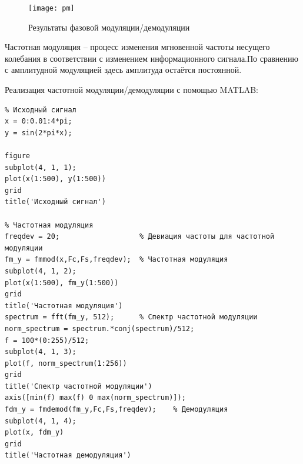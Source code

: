 \documentclass[10pt,a4paper]{article}
\begin{document}
\begin{figure}[h]\centering
	\texttt{[image: pm]}
	\caption{Результаты фазовой модуляции/демодуляции}\label{fig.pm}
\end{figure}                                                                                                                                                                                                                                                                                                                                                                                                                                                                                                                                                                                                                                                                                                                                                                                                                                                                                                                                                                                                                                                                                                                                                                                                                                                                                                                                                                                                                                                                        
\FloatBarrier

Частотная модуляция – процесс изменения мгновенной частоты несущего колебания в соответствии с изменением информационного сигнала.По сравнению с амплитудной модуляцией здесь амплитуда остаётся постоянной.

Реализация частотной модуляции/демодуляции с помощью MATLAB:
\begin{verbatim}
% Исходный сигнал
x = 0:0.01:4*pi;
y = sin(2*pi*x);

figure
subplot(4, 1, 1);
plot(x(1:500), y(1:500))
grid
title('Исходный сигнал')
 
% Частотная модуляция
freqdev = 20;                	% Девиация частоты для частотной модуляции
fm_y = fmmod(x,Fc,Fs,freqdev); 	% Частотная модуляция
subplot(4, 1, 2);
plot(x(1:500), fm_y(1:500))
grid
title('Частотная модуляция')
spectrum = fft(fm_y, 512);      % Спектр частотной модуляции
norm_spectrum = spectrum.*conj(spectrum)/512;  
f = 100*(0:255)/512;
subplot(4, 1, 3);
plot(f, norm_spectrum(1:256))
grid
title('Спектр частотной модуляции')
axis([min(f) max(f) 0 max(norm_spectrum)]);
fdm_y = fmdemod(fm_y,Fc,Fs,freqdev); 	% Демодуляция
subplot(4, 1, 4);
plot(x, fdm_y)
grid
title('Частотная демодуляция')

\end{verbatim}
\end{document}
